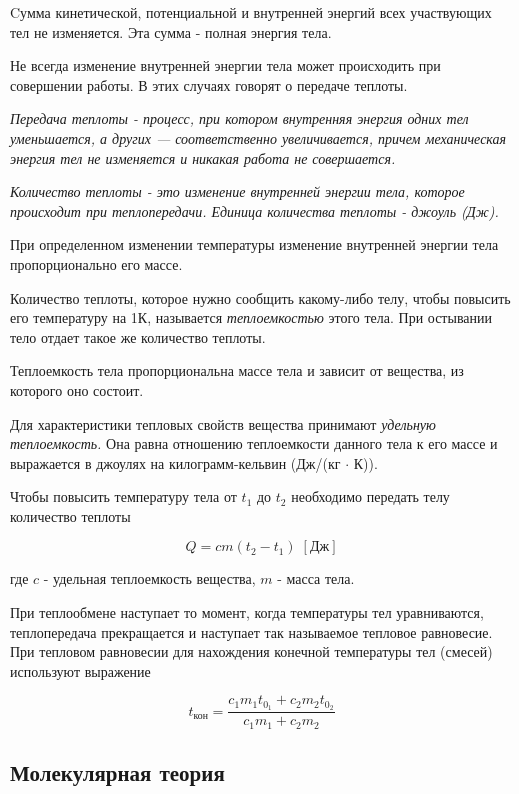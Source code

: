 \documentclass[a4paper,12pt]{article}
\begin{document}
		Cумма кинетической, потенциальной и внутренней энергий всех участвующих тел не изменяется. 
		Эта сумма - полная энергия тела.

		Не всегда изменение внутренней энергии тела может происходить при совершении работы. 
		В этих случаях говорят о передаче теплоты.

		\textit{Передача теплоты - процесс, при котором внутренняя энергия одних тел уменьшается, 
		а других — соответственно увеличивается, причем механическая энергия тел не изменяется и 
		никакая работа не совершается.}

		\textit{Количество теплоты - это изменение внутренней энергии тела, которое происходит при
		теплопередачи. Единица количества теплоты - джоуль (Дж).}

		При определенном изменении температуры изменение внутренней энергии тела пропорционально
		его массе.

		Количество теплоты, которое нужно сообщить какому-либо телу, чтобы повысить его температуру
		на 1К, называется \textit{теплоемкостью} этого тела. При остывании тело отдает такое же
		количество теплоты.
		
		Теплоемкость тела пропорциональна массе тела и зависит от вещества, из которого оно
		состоит.

		Для характеристики тепловых свойств вещества принимают \textit{удельную теплоемкость.}
		Она равна отношению теплоемкости данного тела к его массе и выражается в джоулях на 
		килограмм-кельвин (Дж/(кг $\cdot$ К)).

		Чтобы повысить температуру тела от $t_1$ до $t_2$ необходимо передать телу количество
		теплоты

		\begin{equation}
			Q = cm(t_2-t_1) \; [\text{Дж}]
		\end{equation}

		где $c$ - удельная теплоемкость вещества, $m$ - масса тела.

		При теплообмене наступает то момент, когда температуры тел уравниваются, теплопередача
		прекращается и наступает так называемое тепловое равновесие.
		При тепловом равновесии для нахождения конечной температуры тел (смесей) используют 
		выражение

		\begin{equation}
			t_{\text{кон}} = \frac{c_1 m_1 t_{0_1} + c_2 m_2 t_{0_2}}{c_1 m_1 + c_2 m_2}
		\end{equation}


		\subsection*{Молекулярная теория}
		
\end{document}
